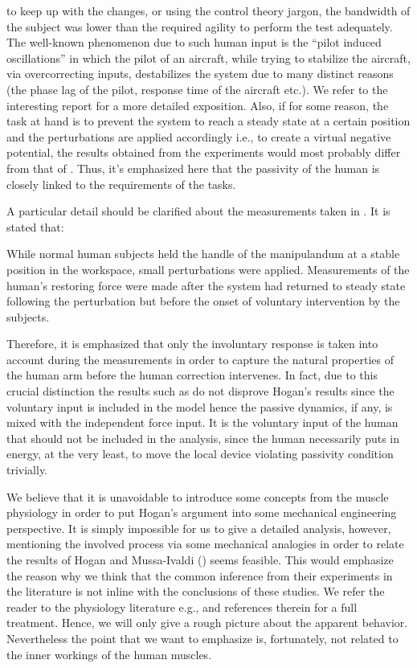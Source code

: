 to keep up with the changes, or using the control theory jargon, the bandwidth of the subject was lower than the required agility to 
perform the test adequately. The well-known phenomenon due to such human input is the \enquote{pilot induced oscillations} in which the 
pilot of an aircraft, while trying to stabilize the aircraft, via overcorrecting inputs, destabilizes the system due to many distinct 
reasons (the phase lag of the pilot, response time of the aircraft etc.). We refer to the interesting report \cite{mcruer} for a more 
detailed exposition. Also, if for some reason, the task at hand is to prevent the system to reach a steady state at a certain position 
and the perturbations are applied accordingly i.e., to create a virtual negative potential, the results obtained from the experiments 
would most probably differ from that of \cite{mussa85}. Thus, it's emphasized here that the passivity of the human is closely linked 
to the requirements of the tasks. 


\begin{rem}\label{rem:filament}
A particular detail should be clarified about the measurements taken in \cite{hogan89}. It is stated that: 
\begin{displayquote}
While normal human subjects held the handle of the manipulandum at a stable position
in the workspace, small perturbations were applied. Measurements
of the human's restoring force were made after the system
had returned to steady state following the perturbation but before
the onset of voluntary intervention by the subjects.
\end{displayquote}
Therefore, it is emphasized that only the involuntary response is taken into account during the measurements in order to
capture the natural properties of the human arm before the human correction intervenes. In fact, due to this crucial distinction
the results such as \cite{dyck2013} do not disprove Hogan's results since the voluntary input is included in the model hence the passive 
dynamics, if any, is mixed with the independent force input. It is the voluntary input of the human that should not be included in the 
analysis, since the human necessarily puts in energy, at the very least, to move the local device violating passivity condition trivially.
\end{rem}

We believe that it is unavoidable to introduce some concepts from the muscle physiology in order to put Hogan's 
argument into some mechanical engineering perspective. It is simply impossible for us to give a detailed analysis, 
however, mentioning the involved process via some mechanical analogies in order to relate the results of 
Hogan and Mussa-Ivaldi (\cite{mussa85}) seems feasible. This would emphasize the reason why we think that the common inference 
from their experiments in the literature is not inline with the conclusions of these studies. We refer the reader 
to the physiology literature e.g., \cite{spudich,millman,offer,horowits,yildiz,geeves} and references therein for a full 
treatment. Hence, we will only give a rough picture about the apparent behavior. Nevertheless the point that we want 
to emphasize is, fortunately, not related to the inner workings of the human muscles.

